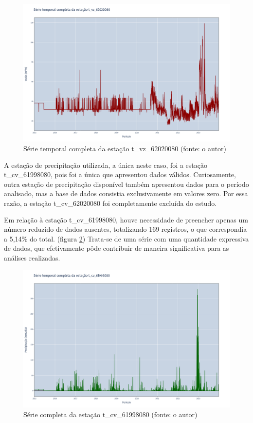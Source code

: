 \begin{figure}[!h]
\centering
\includegraphics[scale=0.25]{Figuras/rio_grande/grandeSerieCompleta_t_vz_62020080.png}
\caption{Série temporal completa da estação t\_vz\_62020080 (fonte: o autor)}
\label{fig:grandeSerieCompleta_t_vz_62020080}
\end{figure}

A estação de precipitação utilizada, a única neste caso, foi a estação t\_cv\_61998080, pois foi a única que apresentou dados válidos. Curiosamente, outra estação de precipitação disponível também apresentou dados para o período analisado, mas a base de dados consistia exclusivamente em valores zero. Por essa razão, a estação t\_cv\_62020080 foi completamente excluída do estudo.

Em relação à estação t\_cv\_61998080, houve necessidade de preencher apenas um número reduzido de dados ausentes, totalizando 169 registros, o que correspondia a 5,14\% do total. (figura \ref{fig:grandeSerieCompleta_t_cv_61998080}) Trata-se de uma série com uma quantidade expressiva de dados, que efetivamente pôde contribuir de maneira significativa para as análises realizadas.

\begin{figure}[!h]
\centering
\includegraphics[scale=0.25]{Figuras/rio_grande/grandeSerieCompleta_t_cv_61998080.png}
\caption{Série completa da estação t\_cv\_61998080 (fonte: o autor)}
\label{fig:grandeSerieCompleta_t_cv_61998080}
\end{figure}

